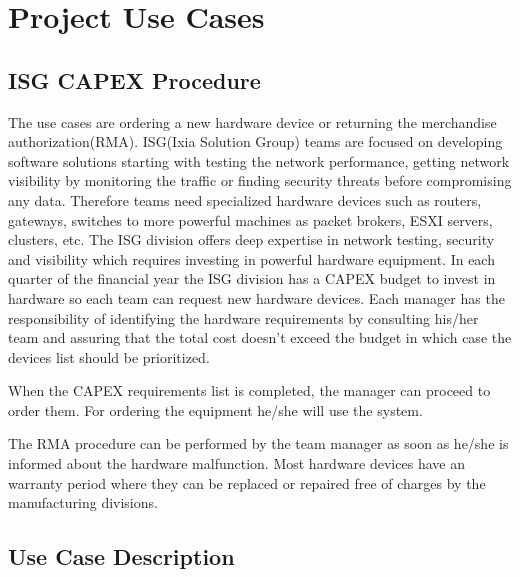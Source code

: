 \chapter{Project Use Cases}
\label{chapter:chapter4}

\section{ISG CAPEX Procedure}
\label{sub-sec:chapter4-section1}
The \emph{\project} use cases are ordering a new hardware device or returning the merchandise authorization(RMA).
ISG(Ixia Solution Group) teams are focused on developing software solutions starting with testing the network performance, getting network visibility by monitoring the traffic or finding security threats before compromising any data.
Therefore teams need specialized hardware devices such as routers, gateways, switches to more powerful machines as packet brokers, ESXI servers, clusters, etc.
The ISG division offers deep expertise in network testing, security and visibility which requires investing in powerful hardware equipment.
In each quarter of the financial year the ISG division has a CAPEX budget to invest in hardware so each team can request new hardware devices.
Each manager has the responsibility of identifying the hardware requirements by consulting his/her team and assuring that the total cost doesn't exceed the budget in which case the devices list should be prioritized.

When the CAPEX requirements list is completed, the manager can proceed to order them.
For ordering the equipment he/she will use the \emph{\project} system.

The RMA procedure can be performed by the team manager as soon as he/she is informed about the hardware malfunction. Most hardware devices have an warranty period where they can be replaced or repaired free of charges by the manufacturing divisions. 

\section{Use Case Description}
\label{sub-sec:chapter4-section1}




